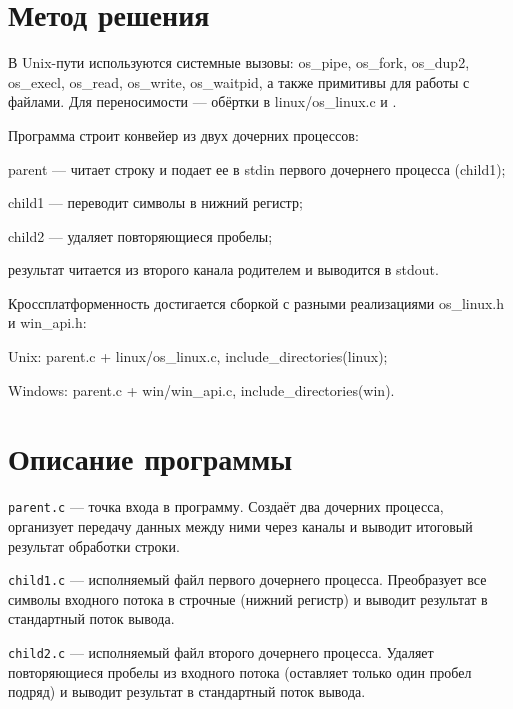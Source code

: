 \section{Метод решения}
В Unix-пути используются системные вызовы: os\_pipe, os\_fork, os\_dup2, os\_execl, os\_read, os\_write, os\_waitpid, а также примитивы для работы с файлами. Для переносимости — обёртки в linux/os\_linux.c и .

Программа строит конвейер из двух дочерних процессов:

parent — читает строку и подает ее в stdin первого дочернего процесса (child1);

child1 — переводит символы в нижний регистр;

child2 — удаляет повторяющиеся пробелы;

результат читается из второго канала родителем и выводится в stdout.

Кроссплатформенность достигается сборкой с разными реализациями os\_linux.h и win\_api.h:

Unix: parent.c + linux/os\_linux.c, include\_directories(linux);

Windows: parent.c + win/win\_api.c, include\_directories(win).

\section{Описание программы}

\texttt{parent.c} --- точка входа в программу. Создаёт два дочерних процесса, организует передачу данных между ними через каналы и выводит итоговый результат обработки строки.

\texttt{child1.c} --- исполняемый файл первого дочернего процесса. Преобразует все символы входного потока в строчные (нижний регистр) и выводит результат в стандартный поток вывода.

\texttt{child2.c} --- исполняемый файл второго дочернего процесса. Удаляет повторяющиеся пробелы из входного потока (оставляет только один пробел подряд) и выводит результат в стандартный поток вывода.


